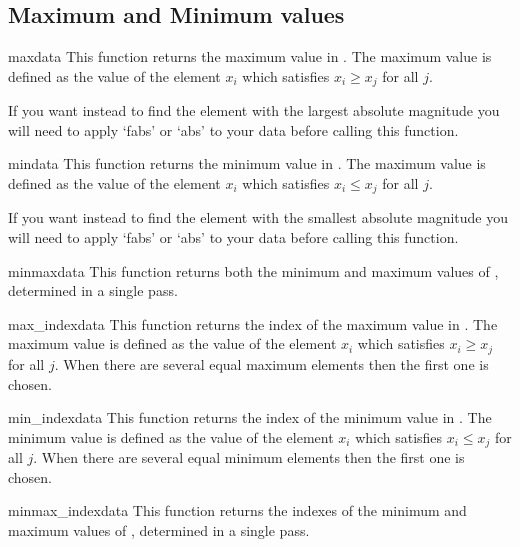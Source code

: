 \subsection{Maximum and Minimum values}
\label{sec:stat:max-min-value}


\begin{funcdesc}{max}{data}
   This function returns the maximum value in .  The maximum value is
   defined as the value of the element $x_i$ which satisfies $x_i \ge x_j$ for
   all $j$.
   
   If you want instead to find the element with the largest absolute magnitude
   you will need to apply `fabs' or `abs' to your data before calling this
   function.
\end{funcdesc}

\begin{funcdesc}{min}{data}
   This function returns the minimum value in . The maximum value is
   defined as the value of the element $x_i$ which satisfies $x_i \le x_j$ for
   all $j$.
   
   If you want instead to find the element with the smallest absolute magnitude
   you will need to apply `fabs' or `abs' to your data before calling this
   function.
\end{funcdesc}

\begin{funcdesc}{minmax}{data}
   This function returns both the minimum and maximum values of ,
   determined in a single pass.
\end{funcdesc}

\begin{funcdesc}{max_index}{data}
   This function returns the index of the maximum value in .  The
   maximum value is defined as the value of the element $x_i$ which satisfies
   $x_i \ge x_j$ for all $j$.  When there are several equal maximum elements
   then the first one is chosen.
\end{funcdesc}

\begin{funcdesc}{min_index}{data}
   This function returns the index of the minimum value in .  The
   minimum value is defined as the value of the element $x_i$ which satisfies
   $x_i \le x_j$ for all $j$.  When there are several equal minimum elements
   then the first one is chosen.
\end{funcdesc}

\begin{funcdesc}{minmax_index}{data}
   This function returns the indexes of the minimum and maximum values of
   , determined in a single pass.
\end{funcdesc}



